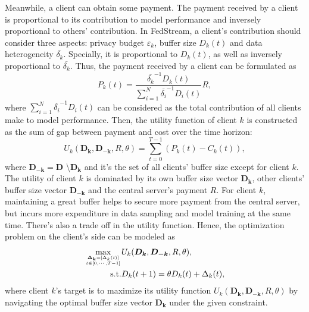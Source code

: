 \documentclass{article}
\theoremstyle{plain}
\theoremstyle{definition}
\theoremstyle{remark}
\begin{document}
Meanwhile, a client can obtain some payment.
The payment received by a client is proportional to its contribution to model performance and inversely proportional to others' contribution.
In FedStream, a client's contribution should consider three aspects: privacy budget $\varepsilon_k$, buffer size $D_k(t)$ and data heterogeneity $\overline{\delta_k}$.
Specially, it is proportional to $D_k(t)$, as well as inversely proportional to $\overline{\delta_k}$.
Thus, the payment received by a client can be formulated as
\begin{equation}
  P_k(t) = \frac{\overline{\delta_k}^{-1}D_k(t)}{\sum_{i=1}^{N}\overline{\delta_i}^{-1}D_i(t)}R,
\end{equation}
where $\sum_{i=1}^{N} \overline{\delta_i}^{-1}D_i(t)$ can be considered as the total contribution of all clients make to model performance.
Then, the utility function of client $k$ is constructed as the sum of gap between payment and cost over the time horizon:
\begin{equation}
  U_k(\boldsymbol{D_k}, \boldsymbol{D_{-k}}, R, \theta) = \sum_{t=0}^{T-1} \left(P_k(t) - C_k(t)\right),
\end{equation}
where $\boldsymbol{D_{-k}} = \boldsymbol{D}$ \textbackslash $\boldsymbol{D_k}$ and it's the set of all clients' buffer size except for client $k$. 
The utility of client $k$ is dominated by its own buffer size vector $\boldsymbol{D_k}$, other clients' buffer size vector $\boldsymbol{D_{-k}}$ and the central server's payment $R$.
For client $k$, maintaining a great buffer helps to secure more payment from the central server, but incurs more expenditure in data sampling and model training at the same time. There's also a trade off in the utility function.
Hence, the optimization problem on the client's side can be modeled as
\begin{equation}
  \begin{aligned}
    \max_{\boldsymbol{\Delta_k}=[\Delta_k(t)] \atop t \in [0,\cdots,T-1]} & U_k(\boldsymbol{D_k}, \boldsymbol{D_{-k}}, R, \theta), \\
    \text{s.t.} & D_k(t + 1) = \theta D_k(t) + \Delta_k(t),
  \end{aligned}  
\end{equation}
where client $k$'s target is to maximize its utility function $U_k(\boldsymbol{D_k}, \boldsymbol{D_{-k}}, R, \theta)$ by navigating the optimal buffer size vector $\boldsymbol{D_k}$ under the given constraint.
\end{document}
